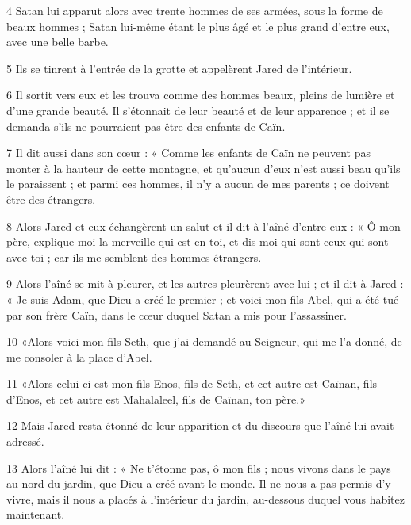 \par 4 Satan lui apparut alors avec trente hommes de ses armées, sous la forme de beaux hommes ; Satan lui-même étant le plus âgé et le plus grand d'entre eux, avec une belle barbe.

\par 5 Ils se tinrent à l'entrée de la grotte et appelèrent Jared de l'intérieur.

\par 6 Il sortit vers eux et les trouva comme des hommes beaux, pleins de lumière et d'une grande beauté. Il s'étonnait de leur beauté et de leur apparence ; et il se demanda s'ils ne pourraient pas être des enfants de Caïn.

\par 7 Il dit aussi dans son cœur : « Comme les enfants de Caïn ne peuvent pas monter à la hauteur de cette montagne, et qu'aucun d'eux n'est aussi beau qu'ils le paraissent ; et parmi ces hommes, il n’y a aucun de mes parents ; ce doivent être des étrangers.

\par 8 Alors Jared et eux échangèrent un salut et il dit à l'aîné d'entre eux : « Ô mon père, explique-moi la merveille qui est en toi, et dis-moi qui sont ceux qui sont avec toi ; car ils me semblent des hommes étrangers.

\par 9 Alors l'aîné se mit à pleurer, et les autres pleurèrent avec lui ; et il dit à Jared : « Je suis Adam, que Dieu a créé le premier ; et voici mon fils Abel, qui a été tué par son frère Caïn, dans le cœur duquel Satan a mis pour l'assassiner.

\par 10 «Alors voici mon fils Seth, que j'ai demandé au Seigneur, qui me l'a donné, de me consoler à la place d'Abel.

\par 11 «Alors celui-ci est mon fils Enos, fils de Seth, et cet autre est Caïnan, fils d'Enos, et cet autre est Mahalaleel, fils de Caïnan, ton père.»

\par 12 Mais Jared resta étonné de leur apparition et du discours que l'aîné lui avait adressé.

\par 13 Alors l'aîné lui dit : « Ne t'étonne pas, ô mon fils ; nous vivons dans le pays au nord du jardin, que Dieu a créé avant le monde. Il ne nous a pas permis d'y vivre, mais il nous a placés à l'intérieur du jardin, au-dessous duquel vous habitez maintenant.

